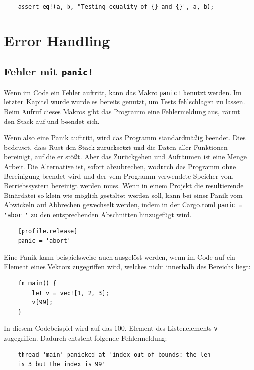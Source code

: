\begin{lstlisting}
    assert_eq!(a, b, "Testing equality of {} and {}", a, b);
\end{lstlisting}


\section{Error Handling}

\subsection{Fehler mit \texttt{panic!}}

Wenn im Code ein Fehler auftritt, kann das Makro \verb"panic!" benutzt werden. Im letzten Kapitel wurde wurde es bereits genutzt, um Tests fehlschlagen zu lassen. Beim Aufruf dieses Makros gibt das Programm eine Fehlermeldung aus, räumt den Stack auf und beendet sich.

Wenn also eine Panik auftritt, wird das Programm standardmäßig beendet. Dies bedeutet, dass Rust den Stack zurücksetzt und die Daten aller Funktionen bereinigt, auf die er stößt. Aber das Zurückgehen und Aufräumen ist eine Menge Arbeit. Die Alternative ist, sofort abzubrechen, wodurch das Programm ohne Bereinigung beendet wird und der vom Programm verwendete Speicher vom Betriebssystem bereinigt werden muss. Wenn in einem Projekt die resultierende Binärdatei so klein wie möglich gestaltet werden soll, kann bei einer Panik vom \glqq Abwickeln\grqq{} auf \glqq Abbrechen\grqq{} gewechselt werden, indem in der Cargo.toml \verb"panic = 'abort'" zu den entsprechenden Abschnitten hinzugefügt wird.

\begin{lstlisting}
    [profile.release]
    panic = 'abort'
\end{lstlisting}

Eine Panik kann beispielsweise auch ausgelöst werden, wenn im Code auf ein Element eines Vektors zugegriffen wird, welches nicht innerhalb des Bereichs liegt:

\begin{lstlisting}
    fn main() {
        let v = vec![1, 2, 3];
        v[99];
    }
\end{lstlisting}

In diesem Codebeispiel wird auf das 100. Element des Listenelements \verb"v" zugegriffen. Dadurch entsteht folgende Fehlermeldung:

\begin{lstlisting}
    thread 'main' panicked at 'index out of bounds: the len
    is 3 but the index is 99'
\end{lstlisting}

